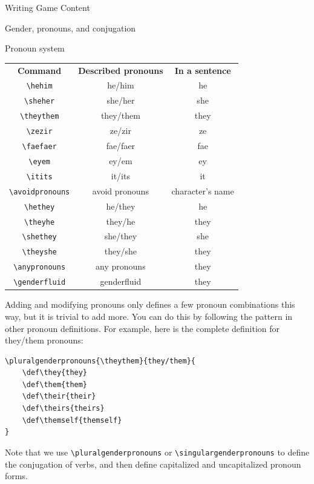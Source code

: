 \documentclass[sheet]{GameTexBase}
\begin{document}
\begin{section}{Writing Game Content}
\begin{subsection}{Gender, pronouns, and conjugation}
\begin{subsubsection}{Pronoun system}
\begin{center}
\begin{tabular}{c|c|c}
\textbf{Command} & \textbf{Described pronouns} & \textbf{In a sentence} \\
\lstinline|\hehim| & he/him & he \\
\lstinline|\sheher| & she/her & she \\
\lstinline|\theythem| & they/them & they \\
\lstinline|\zezir| & ze/zir & ze \\
\lstinline|\faefaer| & fae/faer & fae \\
\lstinline|\eyem| & ey/em & ey \\
\lstinline|\itits| & it/its & it \\
\lstinline|\avoidpronouns| & avoid pronouns & character's name\\
\lstinline|\hethey| & he/they & he \\
\lstinline|\theyhe| & they/he & they \\
\lstinline|\shethey| & she/they & she \\
\lstinline|\theyshe| & they/she & they \\
\lstinline|\anypronouns| & any pronouns & they \\
\lstinline|\genderfluid| & genderfluid & they
\end{tabular}
\end{center}
\end{subsubsection}
\begin{subsubsection}{Adding and modifying pronouns}
\lrstex{} only defines a few pronoun combinations this way, but it is trivial to add more.  You can do this by following the pattern in other pronoun definitions.  For example, here is the complete definition for they/them pronouns:

\begin{verbatim}
\pluralgenderpronouns{\theythem}{they/them}{
	\def\they{they}
	\def\them{them}
	\def\their{their}
	\def\theirs{theirs}
	\def\themself{themself}
}
\end{verbatim}
Note that we use \lstinline|\pluralgenderpronouns| or \lstinline|\singulargenderpronouns| to define the conjugation of verbs, and then define capitalized and uncapitalized pronoun forms.


\end{subsubsection}
\end{subsection}
\end{section}
\end{document}
